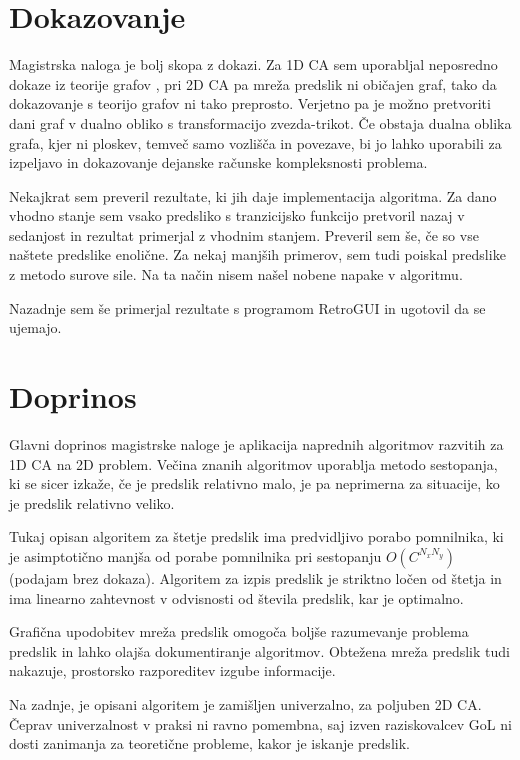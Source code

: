 \documentclass[12pt,a4paper,openany,twoside]{book}
\begin{document}
\section{Dokazovanje}

Magistrska naloga je bolj skopa z dokazi.
Za 1D CA sem uporabljal neposredno dokaze iz teorije grafov \cite{JerasDobnikar2007},
pri 2D CA pa mreža predslik ni običajen graf,
tako da dokazovanje s teorijo grafov ni tako preprosto.
Verjetno pa je možno pretvoriti dani graf v dualno obliko s transformacijo zvezda-trikot.
Če obstaja dualna oblika grafa, kjer ni ploskev, temveč samo vozlišča in povezave,
bi jo lahko uporabili za izpeljavo in dokazovanje dejanske računske kompleksnosti problema.

Nekajkrat sem preveril rezultate, ki jih daje implementacija algoritma.
Za dano vhodno stanje sem vsako predsliko s tranzicijsko funkcijo
pretvoril nazaj v sedanjost in rezultat primerjal z vhodnim stanjem.
Preveril sem še, če so vse naštete predslike enolične.
Za nekaj manjših primerov, sem tudi poiskal predslike z metodo surove sile.
Na ta način nisem našel nobene napake v algoritmu.

Nazadnje sem še primerjal rezultate s programom RetroGUI \cite{Bickford2012}
in ugotovil da se ujemajo.

\section{Doprinos}

Glavni doprinos magistrske naloge je aplikacija
naprednih algoritmov razvitih za 1D CA na 2D problem.
Večina znanih algoritmov uporablja metodo sestopanja,
ki se sicer izkaže, če je predslik relativno malo,
je pa neprimerna za situacije, ko je predslik relativno veliko.

Tukaj opisan algoritem za štetje predslik ima predvidljivo porabo pomnilnika,
ki je asimptotično manjša od porabe pomnilnika pri sestopanju \(O(C^{N_x N_y})\) (podajam brez dokaza).
Algoritem za izpis predslik je striktno ločen od štetja in
ima linearno zahtevnost v odvisnosti od števila predslik, kar je optimalno.

Grafična upodobitev mreža predslik omogoča boljše razumevanje problema predslik
in lahko olajša dokumentiranje algoritmov.
Obtežena mreža predslik tudi nakazuje,
prostorsko razporeditev izgube informacije.

Na zadnje, je opisani algoritem je zamišljen univerzalno, za poljuben 2D CA.
Čeprav univerzalnost v praksi ni ravno pomembna,
saj izven raziskovalcev GoL ni dosti zanimanja za teoretične probleme,
kakor je iskanje predslik.
\end{document}
